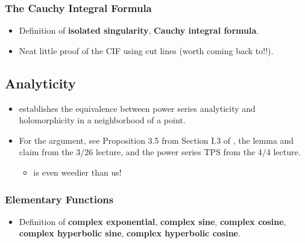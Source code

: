 \documentclass[../finalProject.tex]{subfiles}
\begin{document}
\subsubsection{The Cauchy Integral Formula}
\begin{itemize}
    \item Definition of \textbf{isolated singularity}, \textbf{Cauchy integral formula}.
    \item Neat little proof of the CIF using cut lines (worth coming back to!!).
\end{itemize}


\subsection{Analyticity}
\begin{itemize}
    \item \textcite{bib:Seaborn} establishes the equivalence between power series analyticity and holomorphicity in a neighborhood of a point.
    \item For the argument, see Proposition 3.5 from Section I.3 of \textcite{bib:FischerLieb}, the lemma and claim from the 3/26 lecture, and the power series TPS from the 4/4 lecture.
    \begin{itemize}
        \item \textcite{bib:Seaborn} is even weedier than us!
    \end{itemize}
\end{itemize}

\subsubsection{Elementary Functions}
\begin{itemize}
    \item Definition of \textbf{complex exponential}, \textbf{complex sine}, \textbf{complex cosine}, \textbf{complex hyperbolic sine}, \textbf{complex hyperbolic cosine}.
\end{itemize}
\end{document}
